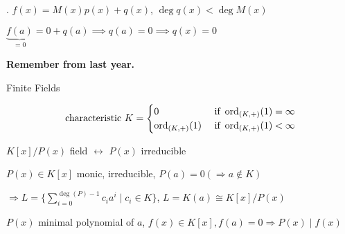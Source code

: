 \Proof.
$f(x) = M(x) p(x) + q(x)$, $\deg q(x) < \deg M(x)$

$\underbrace{f(a)}_{=0} = 0 + q(a) \implies q(a) = 0 \implies q(x) = 0$

\textbf{Remember from last year.}

Finite Fields

\[
  \text{characteristic } K =
  \begin{cases}
    0                & \text{ if } \operatorname{ord}_{(K,+)} (1) = \infty \\
    \operatorname{ord}_{(K,+)} (1) & \text{ if } \operatorname{ord}_{(K,+)} (1) < \infty \\
  \end{cases}
\]

$K[x] / P(x)$ field $\leftrightarrow$ $P(x)$ irreducible

$P(x) \in K[x]$ monic, irreducible, $P(a) = 0 ( \Rightarrow a \not\in K)$

$\Rightarrow L = \{ \sum_{i=0}^{\deg(P)-1} c_i a^i \mid c_i \in K \}$,
$L = K(a) \cong K[x] / P(x)$

$P(x)$ minimal polynomial of $a$, $f(x) \in K[x], f(a) = 0 \Rightarrow P(x)∣f(x)$


